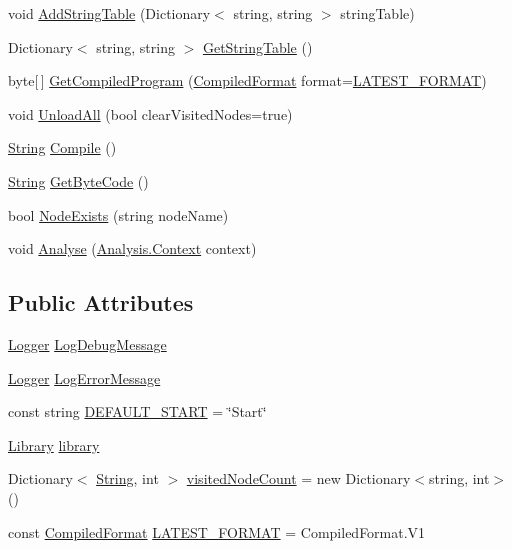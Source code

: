 \begin{DoxyCompactItemize}
\item 
void \hyperlink{a00072_acfb8561e08dc85c6d9a855ad07d18783}{Add\-String\-Table} (Dictionary$<$ string, string $>$ string\-Table)
\item 
Dictionary$<$ string, string $>$ \hyperlink{a00072_af5fe57ebd11c41208070972f06a31b9d}{Get\-String\-Table} ()
\item 
byte\mbox{[}$\,$\mbox{]} \hyperlink{a00072_a5b664d4bbe7c47c246fe0beca9648687}{Get\-Compiled\-Program} (\hyperlink{a00072_a903f18cdcc66c28ceab5a43c41fe074d}{Compiled\-Format} format=\hyperlink{a00072_a3bc83587462ade6a2f7f42cb7576e50e}{L\-A\-T\-E\-S\-T\-\_\-\-F\-O\-R\-M\-A\-T})
\item 
void \hyperlink{a00072_a7acfe32f91b36ee812059f2ad3011133}{Unload\-All} (bool clear\-Visited\-Nodes=true)
\item 
\hyperlink{a00031_a301aa7c866593a5b625a8fc158bbeacea27118326006d3829667a400ad23d5d98}{String} \hyperlink{a00072_a7a8a3a461011172f5624da3a8ffa875f}{Compile} ()
\item 
\hyperlink{a00031_a301aa7c866593a5b625a8fc158bbeacea27118326006d3829667a400ad23d5d98}{String} \hyperlink{a00072_aade6c069db8f01572060d25a963d2a14}{Get\-Byte\-Code} ()
\item 
bool \hyperlink{a00072_a93bb76a1f9a4058f225ff4cee97483c6}{Node\-Exists} (string node\-Name)
\item 
void \hyperlink{a00072_a6b67b239f50c062160666e54592c433f}{Analyse} (\hyperlink{a00037}{Analysis.\-Context} context)
\end{DoxyCompactItemize}
\subsection*{Public Attributes}
\begin{DoxyCompactItemize}
\item 
\hyperlink{a00031_a1e50031b945a3a2afafee6f590730568}{Logger} \hyperlink{a00072_a381f48bb0fbb294f8cf44ca57f11be31}{Log\-Debug\-Message}
\item 
\hyperlink{a00031_a1e50031b945a3a2afafee6f590730568}{Logger} \hyperlink{a00072_a9801e83dd044d6498fdf6ebcc6bec5ac}{Log\-Error\-Message}
\item 
const string \hyperlink{a00072_a1b643f15f734090e6a58cbf13dafd28f}{D\-E\-F\-A\-U\-L\-T\-\_\-\-S\-T\-A\-R\-T} = \char`\"{}Start\char`\"{}
\item 
\hyperlink{a00103}{Library} \hyperlink{a00072_ae660d4cfb6e296358d2f61d8ee74c66a}{library}
\item 
Dictionary$<$ \hyperlink{a00031_a301aa7c866593a5b625a8fc158bbeacea27118326006d3829667a400ad23d5d98}{String}, int $>$ \hyperlink{a00072_aae9e64354066a1e2fa130629959d772b}{visited\-Node\-Count} = new Dictionary$<$string, int$>$()
\item 
const \hyperlink{a00072_a903f18cdcc66c28ceab5a43c41fe074d}{Compiled\-Format} \hyperlink{a00072_a3bc83587462ade6a2f7f42cb7576e50e}{L\-A\-T\-E\-S\-T\-\_\-\-F\-O\-R\-M\-A\-T} = Compiled\-Format.\-V1
\end{DoxyCompactItemize}
